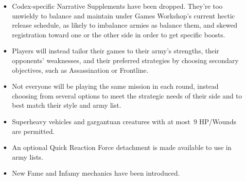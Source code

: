 \begin{itemize}


\item Codex-specific Narrative Supplements have been dropped.  They're
  too unwieldy to balance and maintain under Games Workshop's current
  hectic release schedule, as likely to imbalance armies as balance
  them, and skewed registration toward one or the other side in order
  to get specific boosts.

\item Players will instead tailor their games to their army's
  strengths, their opponents' weaknesses, and their preferred
  strategies by choosing secondary objectives, such as Assassination
  or Frontline.



\item Not everyone will be playing the same mission in each round,
  instead choosing from several options to meet the strategic needs of
  their side and to best match their style and army list.

\item Superheavy vehicles and gargantuan creatures with at most~9
  HP/Wounds are permitted.

\item An optional Quick Reaction Force detachment is made available to
  use in army lists.

\item New Fame and Infamy mechanics have been introduced.
\end{itemize}

